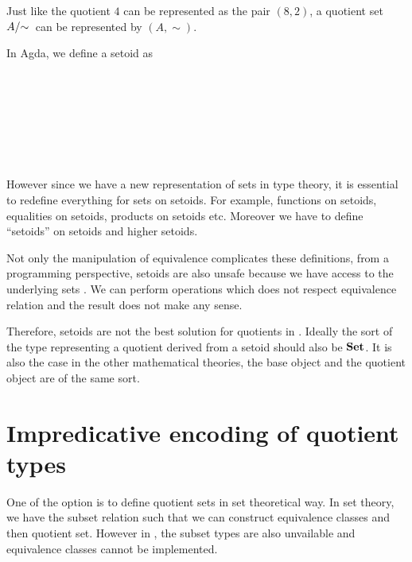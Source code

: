 Just like the quotient $4$
can be represented as the pair $(8,2)$, a quotient set $\qset{A}$ can
be represented by $(A, \sim)$.

In Agda, we define a setoid as

\begin{code}
\\
\>  \AgdaSymbol{:}  \<%
\\
\>[0]\<[2]%
\>[2]\<%
\\
\>[2]\<[4]%
\>[4] \<[22]%
\>[22]\AgdaSymbol{:} \<%
\\
\>[2]\<[4]%
\>[4] \<[23]%
\>[23]\AgdaSymbol{:}     \<%
\\
\>[2]\<[4]%
\>[4] \AgdaSymbol{:}  \<%
\\
\end{code}


However since we have a new representation
of sets in type theory, it is essential to redefine everything for sets on
setoids. For example, functions on setoids, equalities on setoids,
products on setoids etc. Moreover we have to define ``setoids''
on setoids and higher setoids.


Not only the manipulation of equivalence complicates
these definitions, from a programming perspective, setoids are also
unsafe because we have access to the underlying
 sets \cite{aan}. We can perform operations which does not respect
 equivalence relation and the result does not make any sense.

Therefore, setoids are not the best solution for quotients in \itt.
Ideally the sort of the type representing a quotient derived from a setoid
should also be $\operatorname{\mathbf{Set}}$. It is
also the case in the other mathematical theories, the
base object and the quotient object are of the same sort. 


\section{Impredicative encoding of quotient types}

One of the option is to define quotient sets in set theoretical way.
In set theory, we have the subset relation such that we can construct equivalence
classes and then quotient set. 
However in \itt, the subset types are also unvailable and equivalence
classes cannot be implemented.

